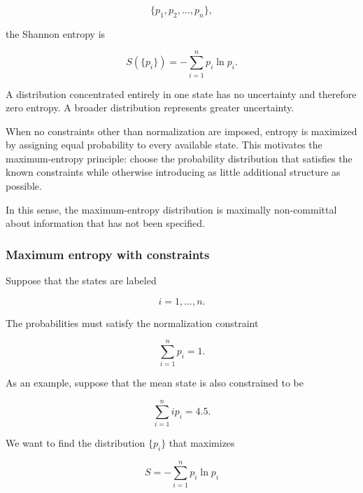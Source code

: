 \begin{equation}
    \{p_1,p_2,\ldots,p_n\},
\end{equation}

the Shannon entropy is

\begin{equation}
    \boxed{S(\{p_i\})=-\sum_{i=1}^{n}p_i\ln p_i.}
\end{equation}

A distribution concentrated entirely in one state has no uncertainty and therefore zero entropy.
A broader distribution represents greater uncertainty.

When no constraints other than normalization are imposed, entropy is maximized by assigning equal probability to every available state.
This motivates the maximum-entropy principle: choose the probability distribution that satisfies the known constraints while otherwise introducing as little additional structure as possible.

In this sense, the maximum-entropy distribution is maximally non-committal about information that has not been specified.


\subsubsection{Maximum entropy with constraints}

Suppose that the states are labeled

\begin{equation}
    i=1,\ldots,n.
\end{equation}

The probabilities must satisfy the normalization constraint

\begin{equation}
    \sum_{i=1}^{n}p_i=1.
\end{equation}

As an example, suppose that the mean state is also constrained to be

\begin{equation}
    \sum_{i=1}^{n}ip_i=4.5.
\end{equation}

We want to find the distribution $\{p_i\}$ that maximizes

\begin{equation}
    S=-\sum_{i=1}^{n}p_i\ln p_i
\end{equation}

